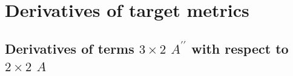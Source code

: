 \documentclass{report}
\begin{document}
% 
% 


\chapter{Derivatives of target metrics}

\section{Derivatives of terms $3 \times 2$ $A^{\prime\prime}$ with respect to $2 \times 2$ $A$}
\end{document}
